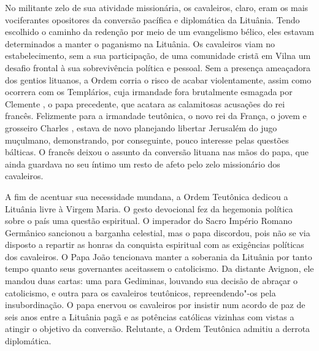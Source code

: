 No militante zelo de sua atividade missionária, os cavaleiros, claro,
eram os mais vociferantes opositores da conversão pacífica e diplomática
da Lituânia. Tendo escolhido o caminho da redenção por meio de um
evangelismo bélico, eles estavam determinados a manter o paganismo na
Lituânia. Os cavaleiros viam no estabelecimento, sem a sua participação,
de uma comunidade cristã em Vilna um desafio frontal à sua sobrevivência
política e pessoal. Sem a presença ameaçadora dos gentios lituanos, a
Ordem corria o risco de acabar violentamente, assim como ocorrera com os
Templários, cuja irmandade fora brutalmente esmagada por Clemente , o
papa precedente, que acatara as calamitosas acusações do rei francês.
Felizmente para a irmandade teutônica, o novo rei da França, o jovem e
grosseiro Charles , estava de novo planejando libertar Jerusalém do
jugo muçulmano, demonstrando, por conseguinte, pouco interesse pelas
questões bálticas. O francês deixou o assunto da conversão lituana nas
mãos do papa, que ainda guardava no seu íntimo um resto de afeto pelo
zelo missionário dos cavaleiros.

A fim de acentuar sua necessidade mundana, a Ordem Teutônica dedicou a
Lituânia livre à Virgem Maria. O gesto devocional fez da hegemonia
política sobre o país uma questão espiritual. O imperador do Sacro
Império Romano Germânico sancionou a barganha celestial, mas o papa
discordou, pois não se via disposto a repartir as honras da conquista
espiritual com as exigências políticas dos cavaleiros. O Papa João 
tencionava manter a soberania da Lituânia por tanto tempo quanto seus
governantes aceitassem o catolicismo. Da distante Avignon, ele mandou
duas cartas: uma para Gediminas, louvando sua decisão de abraçar o
catolicismo, e outra para os cavaleiros teutônicos, repreendendo"-os pela
insubordinação. O papa enervou os cavaleiros por insistir num acordo de
paz de seis anos entre a Lituânia pagã e as potências católicas vizinhas
com vistas a atingir o objetivo da conversão. Relutante, a Ordem
Teutônica admitiu a derrota diplomática.

